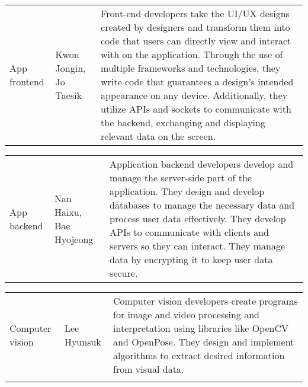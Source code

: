 \begin{enumerate}[label=\arabic*]
          \begin{table}[H]
              \center
              \begin{tabular}{m{1.4cm} m{1.5cm} m{4cm}}
                  App frontend & Kwon Jongin, Jo Taesik & Front-end developers take the UI/UX designs created by designers and transform them into code that users can directly view and interact with on the application. Through the use of multiple frameworks and technologies, they write code that guarantees a design’s intended appearance on any device. Additionally, they utilize APIs and sockets to communicate with the backend, exchanging and displaying relevant data on the screen. \\
              \end{tabular}
          \end{table}

          \begin{table}[H]
              \center
              \begin{tabular}{m{1.4cm} m{1.5cm} m{4cm}}
                  App backend & Nan Haixu, Bae Hyojeong & Application backend developers develop and manage the server-side part of the application. They design and develop databases to manage the necessary data and process user data effectively. They develop APIs to communicate with clients and servers so they can interact. They manage data by encrypting it to keep user data secure. \\
              \end{tabular}
          \end{table}

          \begin{table}[H]
              \center
              \begin{tabular}{m{1.4cm} m{1.5cm} m{4cm}}
                  Computer vision & Lee Hyunsuk & Computer vision developers create programs for image and video processing and interpretation using libraries like OpenCV and OpenPose. They design and implement algorithms to extract desired information from visual data. \\\\
                  \bottomrule
              \end{tabular}
          \end{table}

\end{enumerate}

